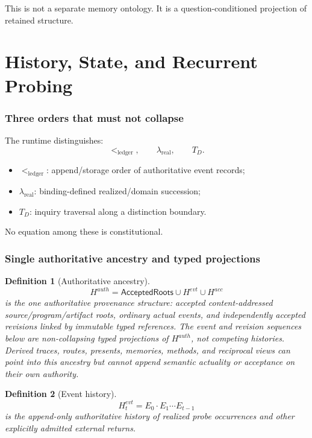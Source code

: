 \documentclass[11pt,oneside]{article}
\newtheorem{definition}{Definition}[section]
\begin{document}
This is not a separate memory ontology.  It is a question-conditioned projection of retained structure.

\part{History, State, and Recurrent Probing}

\section{Three orders that must not collapse}

The runtime distinguishes:
\[
\boxed{
<_{\mathrm{ledger}},
\qquad
\lambda_{\mathrm{real}},
\qquad
T_D.
}
\]

\begin{itemize}
\item \(<_{\mathrm{ledger}}\): append/storage order of authoritative event records;
\item \(\lambda_{\mathrm{real}}\): binding-defined realized/domain succession;
\item \(T_D\): inquiry traversal along a distinction boundary.
\end{itemize}

No equation among these is constitutional.

\section{Single authoritative ancestry and typed projections}

\begin{definition}[Authoritative ancestry]\label{def:authoritative-ancestry}
\[
\boxed{
H^{auth}
=
\mathsf{AcceptedRoots}
\cup H^{evt}
\cup H^{acc}
}
\]
is the one authoritative provenance structure: accepted content-addressed source/program/artifact
roots, ordinary actual events, and independently accepted revisions linked by immutable typed
references.  The event and revision sequences below are non-collapsing typed projections of
\(H^{auth}\), not competing histories.  Derived traces, routes, presents, memories, methods, and
reciprocal views can point into this ancestry but cannot append semantic actuality or acceptance on
their own authority.
\end{definition}

\begin{definition}[Event history]
\[
\boxed{
H_t^{evt}=E_0\cdot E_1\cdots E_{t-1}
}
\]
is the append-only authoritative history of realized probe occurrences and other explicitly admitted external returns.
\end{definition}
\end{document}
